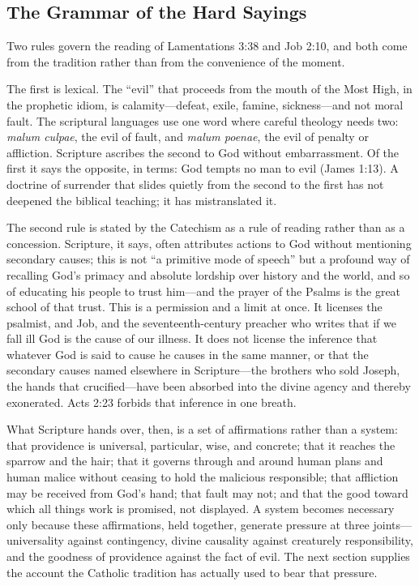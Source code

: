 \subsection{The Grammar of the Hard Sayings}

Two rules govern the reading of Lamentations 3:38 and Job 2:10, and both come from the tradition rather than from the convenience of the moment.

The first is lexical. The ``evil'' that proceeds from the mouth of the Most High, in the prophetic idiom, is calamity---defeat, exile, famine, sickness---and not moral fault. The scriptural languages use one word where careful theology needs two: \emph{malum culpae}, the evil of fault, and \emph{malum poenae}, the evil of penalty or affliction. Scripture ascribes the second to God without embarrassment. Of the first it says the opposite, in terms: God tempts no man to evil (James 1:13). A doctrine of surrender that slides quietly from the second to the first has not deepened the biblical teaching; it has mistranslated it.

The second rule is stated by the Catechism as a rule of reading rather than as a concession. Scripture, it says, often attributes actions to God without mentioning secondary causes; this is not ``a primitive mode of speech'' but a profound way of recalling God's primacy and absolute lordship over history and the world, and so of educating his people to trust him---and the prayer of the Psalms is the great school of that trust. This is a permission and a limit at once. It licenses the psalmist, and Job, and the seventeenth-century preacher who writes that if we fall ill God is the cause of our illness. It does not license the inference that whatever God is said to cause he causes in the same manner, or that the secondary causes named elsewhere in Scripture---the brothers who sold Joseph, the hands that crucified---have been absorbed into the divine agency and thereby exonerated. Acts 2:23 forbids that inference in one breath.

What Scripture hands over, then, is a set of affirmations rather than a system: that providence is universal, particular, wise, and concrete; that it reaches the sparrow and the hair; that it governs through and around human plans and human malice without ceasing to hold the malicious responsible; that affliction may be received from God's hand; that fault may not; and that the good toward which all things work is promised, not displayed. A system becomes necessary only because these affirmations, held together, generate pressure at three joints---universality against contingency, divine causality against creaturely responsibility, and the goodness of providence against the fact of evil. The next section supplies the account the Catholic tradition has actually used to bear that pressure.
